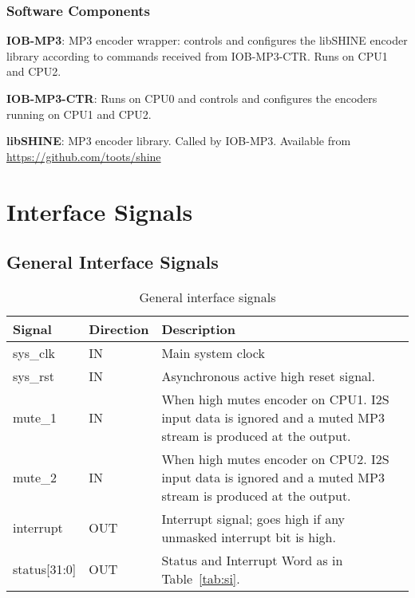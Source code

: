 \documentclass{rep}
\theoremstyle{plain}
\begin{document}
\subsubsection{Software Components}

\begin{description}
\item {\bf IOB-MP3}: MP3 encoder wrapper: controls and configures the
  libSHINE encoder library according to commands received from
  IOB-MP3-CTR. Runs on CPU1 and CPU2.
\item {\bf IOB-MP3-CTR}: Runs on CPU0 and controls and configures the
  encoders running on CPU1 and CPU2.
\item {\bf libSHINE}: MP3 encoder library. Called by IOB-MP3. Available from
  \url{https://github.com/toots/shine}
\end{description}

\section{Interface Signals}

\subsection{General Interface Signals}

\begin{table}[H]
  \begin{center}
    \begin{tabular}{|l|l|p{8cm}|}
      \hline
      \rowcolor{iob-green}
      \textbf{Signal} & \textbf{Direction} & \textbf{Description} \\
      \hline
      \hline

      sys\_clk &  IN & Main system clock \\
      \hline

      \rowcolor{iob-blue} sys\_rst & IN & Asynchronous active high reset
      signal. \\ \hline

      mute\_1 & IN & When high mutes encoder on CPU1. I2S input data
      is ignored and a muted MP3 stream is produced at the
      output. \\ \hline

      \rowcolor{iob-blue}
      mute\_2 & IN & When high mutes encoder on CPU2. I2S input data
      is ignored and a muted MP3 stream is produced at the
      output. \\ \hline

      interrupt & OUT & Interrupt signal; goes high if any
      unmasked interrupt bit is high.\\ \hline

      status[31:0] & OUT & Status and Interrupt Word as in Table~\ref{tab:si}.\\ \hline

    \end{tabular}
    \caption{General interface signals}
    \label{tab:is}
  \end{center}
\end{table}
\end{document}
